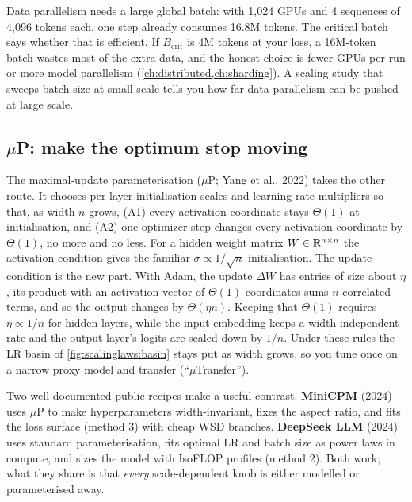 \begin{systemslens}
Data parallelism needs a large global batch: with 1{,}024 GPUs and 4 sequences of 4{,}096 tokens
each, one step already consumes 16.8M tokens. The critical batch says whether that is
efficient. If $B_{\text{crit}}$ is 4M tokens at your loss, a 16M-token batch wastes most of
the extra data, and the honest choice is fewer GPUs per run or more model parallelism
(\cref{ch:distributed,ch:sharding}). A scaling study that sweeps batch size at small scale tells
you how far data parallelism can be pushed at large scale.
\end{systemslens}

\subsection{\texorpdfstring{$\mu$P}{muP}: make the optimum stop moving}\label{sec:scalinglaws:mup}

The maximal-update parameterisation ($\mu$P; Yang et al., 2022) takes the other route. It
chooses per-layer initialisation scales and learning-rate multipliers so that, as width $n$ grows,
(A1) every activation coordinate stays $\Theta(1)$ at initialisation, and (A2) one optimizer
step changes every activation coordinate by $\Theta(1)$, no more and no less. For a hidden
weight matrix $W\in\mathbb{R}^{n\times n}$ the activation condition gives the familiar
$\sigma\propto1/\sqrt{n}$ initialisation. The update condition is the new part. With Adam,
the update $\Delta W$ has entries of size about $\eta$, its product with an activation
vector of $\Theta(1)$ coordinates sums $n$ correlated terms, and so the output changes by
$\Theta(\eta n)$. Keeping that $\Theta(1)$ requires $\eta\propto 1/n$ for hidden layers, while
the input embedding keeps a width-independent rate and the output layer's logits are scaled down
by $1/n$. Under these rules the LR basin of \cref{fig:scalinglaws:basin} stays put as width
grows, so you tune once on a narrow proxy model and transfer (``$\mu$Transfer'').

\begin{keyidea}
Two well-documented public recipes make a useful contrast. \textbf{MiniCPM} (2024) uses
$\mu$P to make hyperparameters width-invariant, fixes the aspect ratio, and fits the
loss surface (method 3) with cheap WSD branches. \textbf{DeepSeek LLM} (2024) uses standard
parameterisation, fits optimal LR and batch size as power laws in compute, and sizes the model
with IsoFLOP profiles (method 2). Both work; what they share is that \emph{every}
scale-dependent knob is either modelled or parameterised away.
\end{keyidea}

